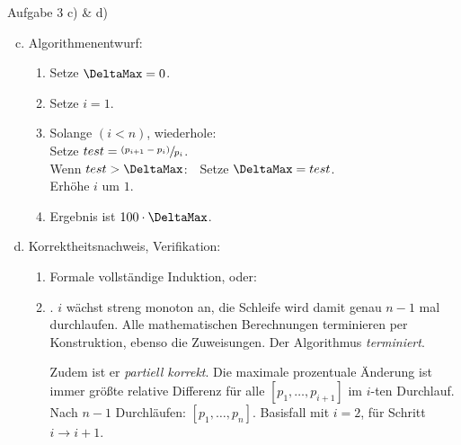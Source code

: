 \begin{frame}[t]{Aufgabe 3 c) \& d)}
    \begin{enumerate}[a)]
        \setcounter{enumi}{2}
        \item \strut Algorithmenentwurf:
        \begin{enumerate}[(1)]
            \itemsep3pt
            \item\pause Setze $\DeltaMax = 0$.
            \item\pause Setze $i = 1$.
            \item\label{alg:st}\pause Solange $(i < n)$, wiederhole:\smallskip\\
                \pause \quad Setze \(test = \sfrac{(p_{i + 1} - p_i)}{p_i}\).\smallskip\\
                \pause \quad Wenn \(test > \DeltaMax\):~~Setze \(\DeltaMax = test\).\smallskip\\
                \pause \quad Erhöhe \(i\) um \(1\).
            \item\pause Ergebnis ist $100 \cdot \DeltaMax$.
        \end{enumerate}
        \medskip%
        \item\pause Korrektheitsnachweis, Verifikation:\begin{enumerate}[1.]
                  \item \pause Formale vollständige Induktion, oder:
                  \item \pause{}.\pause{} \(i\) wächst streng monoton an, die Schleife wird damit genau \(n - 1\) mal durchlaufen.\pause{} Alle mathematischen Berechnungen terminieren per Konstruktion, ebenso die Zuweisungen. Der Algorithmus \textit{terminiert}.\medskip\pause

                  Zudem ist er \textit{partiell korrekt}. Die maximale prozentuale Änderung ist immer größte relative Differenz für alle \([p_1, \ldots, p_{i + 1}]\) im \(i\)-ten Durchlauf.\pause{} Nach \(n - 1\) Durchläufen: \([p_1, \ldots, p_n]\). Basisfall mit \(i = 2\), für Schritt \(i \to i + 1\).
              \end{enumerate}
    \end{enumerate}
\end{frame}

